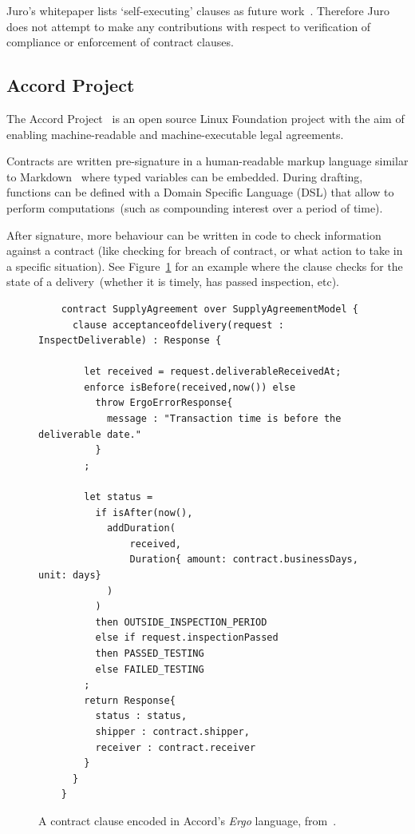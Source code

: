 Juro's whitepaper lists `self-executing' clauses as future work~\cite[p.~6]{juroWhitepaper}.
Therefore Juro does not attempt to make any contributions with respect to verification of compliance or enforcement of
contract clauses.

\subsection{Accord Project}\label{subsec:accord}

The Accord Project~\cite{accordHomepage} is an open source Linux Foundation project with the aim of enabling
machine-readable and machine-executable legal agreements.

Contracts are written pre-signature in a human-readable markup language similar to Markdown~\cite{markdownSpec}
where typed variables can be embedded.
During drafting, functions can be defined with a Domain Specific Language (DSL) that allow to perform
computations~(such as compounding interest over a period of time).

After signature, more behaviour can be written in code to check information against a contract (like checking for
breach of contract, or what action to take in a specific situation).
See Figure~\ref{fig:accord-post-signature-code} for an example where the clause checks for the state of a
delivery~(whether it is timely, has passed inspection, etc).\\

\begin{figure}[th]
    \centering
    \small
    \begin{verbatim}
    contract SupplyAgreement over SupplyAgreementModel {
      clause acceptanceofdelivery(request : InspectDeliverable) : Response {

        let received = request.deliverableReceivedAt;
        enforce isBefore(received,now()) else
          throw ErgoErrorResponse{
            message : "Transaction time is before the deliverable date."
          }
        ;

        let status =
          if isAfter(now(),
            addDuration(
                received,
                Duration{ amount: contract.businessDays, unit: days}
            )
          )
          then OUTSIDE_INSPECTION_PERIOD
          else if request.inspectionPassed
          then PASSED_TESTING
          else FAILED_TESTING
        ;
        return Response{
          status : status,
          shipper : contract.shipper,
          receiver : contract.receiver
        }
      }
    }
    \end{verbatim}
    \caption[Accord contract clause as code]{A contract clause encoded in Accord's \textit{Ergo} language,
        from~\cite{accordAfterSignatureCode}.}
    \label{fig:accord-post-signature-code}
\end{figure}


